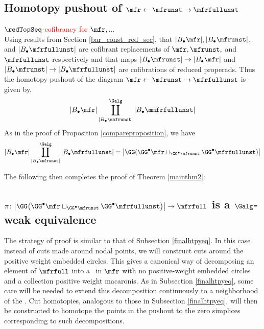 \documentclass[a4paper,10pt]{amsart}
\begin{document}
\subsection{Homotopy pushout of $\mfr \leftarrow \mfrunst \to \mfrfullunst$}

\textcolor{red}{$\redTopSeq$-cofibrancy for $\mfr,...$}\\
Using results from Section \ref{bar_const_red_sec}, that $|B_{\bullet}\mfr |, |B_{\bullet} \mfrunst| $, and $|B_{\bullet}\mfrfullunst |$ are cofibrant replacements of $\mfr, \mfrunst,$ and $\mfrfullunst$ respectively and that maps $|B_{\bullet} \mfrunst | \to |B_{\bullet}\mfr|$ and $|B_{\bullet} \mfrunst | \to |B_{\bullet}\mfrfullunst|$ are cofibrations of reduced properads. Thus the homotopy pushout of the diagram $\mfr \leftarrow \mfrunst \to \mfrfullunst$ is given by,
\[ | B_{\bullet} \mfr | \coprod_{|B_{\bullet} \mmfrunst |}^{\Galg}|B_{\bullet}\mmfrfullunst| \]
As in the proof of Proposition \ref{compareproposition}, we have
\[ | B_{\bullet} \mfr | \coprod_{|B_{\bullet} \mfrunst |}^{\Galg}|B_{\bullet}\mfrfullunst| = \big| \GG( \GG^{\bullet} \mfr \sqcup_{\GG^{\bullet} \mfrunst} \GG^{\bullet} \mfrfullunst) \big| \]

The following then completes the proof of Theorem \ref{mainthm2}:

\subsection{$\pi \colon \big| \GG\big( \GG^{\bullet} \mfr \sqcup_{\GG^{\bullet} \mfrunst} \GG^{\bullet} \mfrfullunst\big) \big| \to \mfrfull$ is a $\Galg$-weak equivalence}
	The strategy of proof is similar to that of Subsection \ref{finalhtpyeq}. In this case instead of cuts made around nodal points, we will construct cuts around the positive weight embedded circles. This gives a canonical way of decomposing an element of $\mfrfull$ into a \splitsurface \ in $\mfr$ with no positive-weight embedded circles and a collection positive weight macaronis. As in Subsection \ref{finalhtpyeq}, some care will be needed to extend this decomposition continuously to a neighborhood of the \splitsurface. Cut homotopies, analogous to those in Subsection \ref{finalhtpyeq}, will then be constructed to homotope the points in the pushout to the zero simplices corresponding to such decompositions.
\end{document}
